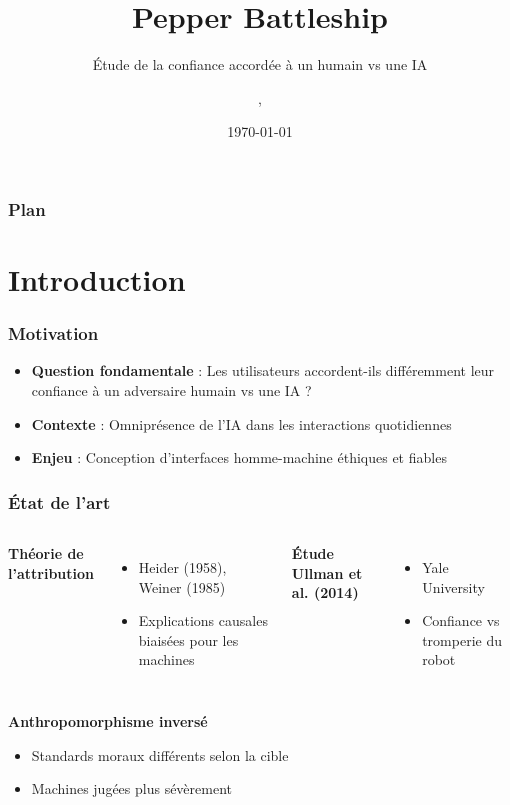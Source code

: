 \documentclass[11pt, french]{beamer}
\title{Pepper Battleship}
\subtitle{Étude de la confiance accordée à un humain vs une IA}
\author{\todo{Prénom NOM}, \todo{Prénom NOM}}
\date{\today}
\institute{Master 1 Génie Logiciel \\ \todo{Université}}
\begin{document}
\begin{frame}
\maketitle
\end{frame}

\begin{frame}
\frametitle{Plan}
\tableofcontents
\end{frame}


\section{Introduction}

\begin{frame}
\frametitle{Motivation}
\begin{itemize}
    \item \textbf{Question fondamentale} : Les utilisateurs accordent-ils différemment leur confiance à un adversaire humain vs une IA ?
    \vspace{0.5cm}
    \item \textbf{Contexte} : Omniprésence de l'IA dans les interactions quotidiennes
    \vspace{0.5cm}
    \item \textbf{Enjeu} : Conception d'interfaces homme-machine éthiques et fiables
\end{itemize}
\end{frame}

\begin{frame}
\frametitle{État de l'art}
\begin{columns}[T]
\textbf{Théorie de l'attribution}
\begin{itemize}
    \item Heider (1958), Weiner (1985)
    \item Explications causales biaisées pour les machines
\end{itemize}

\textbf{Étude Ullman et al. (2014)}
\begin{itemize}
    \item Yale University
    \item Confiance vs tromperie du robot
\end{itemize}
\end{columns}

\vspace{1cm}

\textbf{Anthropomorphisme inversé}
\begin{itemize}
    \item Standards moraux différents selon la cible
    \item Machines jugées plus sévèrement
\end{itemize}
\end{frame}
\end{document}
